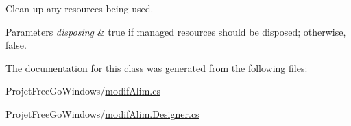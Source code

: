 Clean up any resources being used. 


\begin{DoxyParams}{Parameters}
{\em disposing} & true if managed resources should be disposed; otherwise, false.\\
\hline
\end{DoxyParams}


The documentation for this class was generated from the following files\+:\begin{DoxyCompactItemize}
\item 
Projet\+Free\+Go\+Windows/\hyperlink{modif_alim_8cs}{modif\+Alim.\+cs}\item 
Projet\+Free\+Go\+Windows/\hyperlink{modif_alim_8_designer_8cs}{modif\+Alim.\+Designer.\+cs}\end{DoxyCompactItemize}
